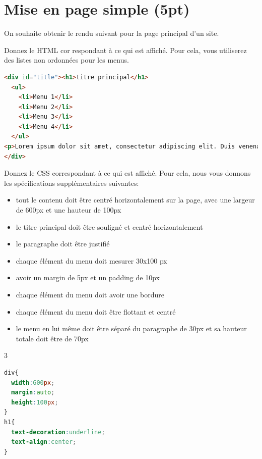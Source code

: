 \documentclass[a4paper,11pt]{exam}
\begin{document}
\section{Mise en page simple (5pt)}
On souhaite obtenir le rendu suivant pour la page principal d'un site.

\begin{center}
\end{center}

\begin{questions}
	\question[2.5] Donnez le HTML cor
	respondant à ce qui est affiché. Pour cela, vous utiliserez des listes non ordonnées pour les menus.
	\begin{solutionorlines}[5cm]
		\scriptsize
		\begin{lstlisting}[frame=leftline,language={HTML},numbers=none]  
<div id="title"><h1>titre principal</h1>
  <ul>
    <li>Menu 1</li>
    <li>Menu 2</li>
    <li>Menu 3</li>
    <li>Menu 4</li>
  </ul>
<p>Lorem ipsum dolor sit amet, consectetur adipiscing elit. Duis venenatis imperdiet nisl, eget scelerisque magna cursus et. Etiam maximus varius odio, vitae congue arcu rutrum id. Aenean nunc metus, auctor. </p>
</div>
\end{lstlisting}


	\end{solutionorlines}
  \question[2.5] Donnez le CSS correspondant à ce qui est affiché. Pour cela, nous vous donnons les spécifications supplémentaires suivantes:
  \scriptsize
	\begin{itemize}
		\item tout le contenu doit être centré horizontalement sur la page, avec une largeur de 600px et une hauteur de 100px
		\item le titre principal doit être souligné et centré horizontalement
		\item le paragraphe doit être justifié
		\item chaque élément du menu doit mesurer 30x100 px
		\item avoir un margin de 5px et un padding de 10px
		\item chaque élément du menu doit avoir une bordure
		\item chaque élément du menu doit être flottant et centré
		\item le menu en lui même doit être séparé du paragraphe de 30px et sa hauteur totale doit être de 70px
  \end{itemize}
  \begin{multicols}{3}
  \begin{solutionorlines}[6.8cm]
		\scriptsize
		\begin{lstlisting}[frame=leftline,language={CSS},numbers=none]  
div{
  width:600px;
  margin:auto;
  height:100px;
}
h1{
  text-decoration:underline;
  text-align:center;
}


\end{lstlisting}
\end{solutionorlines}
\end{multicols}
\end{questions}
\end{document}
